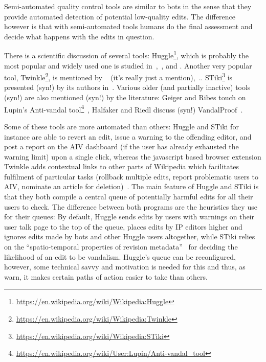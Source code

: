 Semi-automated quality control tools are similar to bots in the sense that they provide automated detection of potential low-quality edits.
The difference however is that with semi-automated tools humans do the final assessment and decide what happens with the edits in question.

There is a scientific discussion of several tools:
Huggle\footnote{\url{https://en.wikipedia.org/wiki/Wikipedia:Huggle}}, which is probably the most popular and widely used one is studied in~\cite{GeiHal2013},~\cite{HalRied2012}, and \cite{GeiRib2010}.
Another very popular tool, Twinkle\footnote{\url{https://en.wikipedia.org/wiki/Wikipedia:Twinkle}}, is mentioned by ~\cite{GeiHal2013} (it's really just a mention),~\cite{GeiRib2010}..
STiki\footnote{\url{https://en.wikipedia.org/wiki/Wikipedia:STiki}} is presented (syn!) by its authors in~\cite{WestKanLee2010}.
Various older (and partially inactive) tools (syn!) are also mentioned (syn!) by the literature:
Geiger and Ribes touch on Lupin's Anti-vandal tool\footnote{\url{https://en.wikipedia.org/wiki/User:Lupin/Anti-vandal_tool}}~\cite{GeiRib2010},
Halfaker and Riedl discuss (syn!) VandalProof~\cite{HalRied2012}.

Some of these tools are more automated than others: Huggle and STiki for instance are able to revert an edit, issue a warning to the offending editor, and post a report on the AIV dashboard (if the user has already exhausted the warning limit) upon a single click,
whereas the javascript based browser extension Twinkle adds contextual links to other parts of Wikipedia which facilitates fulfilment of particular tasks (rollback multiple edits, report problematic users to AIV, nominate an article for deletion)~\cite{GeiRib2010}.
The main feature of Huggle and STiki
is that they both compile a central queue of potentially harmful edits for all their users to check.
The difference between both programs are the heuristics they use for their queues:
By default, Huggle sends edits by users with warnings on their user talk page to the top of the queue, places edits by IP editors higher and ignores edits made by bots and other Huggle users altogether\cite{GeiRib2010},
while STiki relies on the ``spatio-temporal properties of revision metadata''~\cite{WestKanLee2010} for deciding the likelihood of an edit to be vandalism.
Huggle's queue can be reconfigured, however, some technical savvy and motivation is needed for this and thus, as~\cite{GeiRib2010} warn, it makes certain paths of action easier to take than others.

